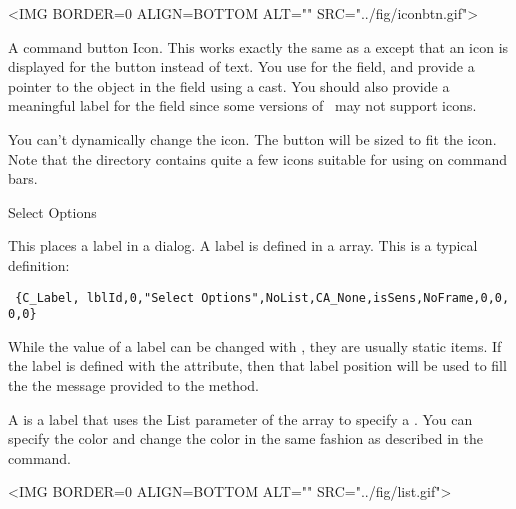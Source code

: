 \small
\begin{rawhtml}
<IMG BORDER=0 ALIGN=BOTTOM ALT="" SRC="../fig/iconbtn.gif">
\end{rawhtml}
\begin{latexonly}

\end{latexonly}
\normalfont\normalsize
\vspace{.1in}

A command button Icon. This works exactly the same as a 
except that an icon is displayed for the button instead of text.
You use  for the  field, and
provide a pointer to the  object in the 
field using a  cast. You should also provide a
meaningful label for the  field since some versions
of \V\ may not support icons.

You can't dynamically change the icon. The button will be sized to
fit the icon. Note that the  directory contains
quite a few icons suitable for using on command bars.


{\Large Select Options}
\vspace{.1in}

This places a label in a dialog. A label is defined in
a  array. This is a typical definition:

\footnotesize
\begin{verbatim}
 {C_Label, lblId,0,"Select Options",NoList,CA_None,isSens,NoFrame,0,0, 0,0}
\end{verbatim}
\normalfont\normalsize

While the value of a label can be changed with 
 , they are usually static
items. If the label is defined with the 
attribute, then that label position will be used to fill the the
message provided to the  method.

A  is a label that uses the
List parameter of the  array to
specify a . You can
specify the color and change the color in the same fashion as
described in the  command.


\small
\begin{rawhtml}
<IMG BORDER=0 ALIGN=BOTTOM ALT="" SRC="../fig/list.gif">
\end{rawhtml}
\begin{latexonly}

\end{latexonly}
\normalfont\normalsize
\vspace{.1in}

